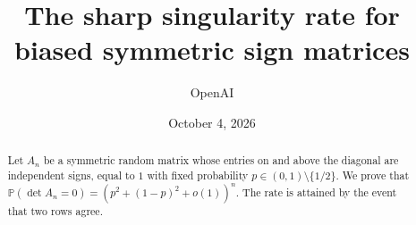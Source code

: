 \documentclass[11pt]{article}
\title{The sharp singularity rate for biased symmetric sign matrices}
\author{OpenAI}
\date{October 4, 2026}
\theoremstyle{definition}
\theoremstyle{remark}
\numberwithin{equation}{section}
\newcommand{\Prob}{\mathbb P}
\begin{document}
\maketitle
\begin{abstract}
Let $A_n$ be a symmetric random matrix whose entries on and above the
diagonal are independent signs, equal to $1$ with fixed probability
$p\in(0,1)\setminus\{1/2\}$. We prove that
$\Prob(\det A_n=0)=(p^2+(1-p)^2+o(1))^n$.
The rate is attained by the event that two rows agree.
\end{abstract}








\end{document}
